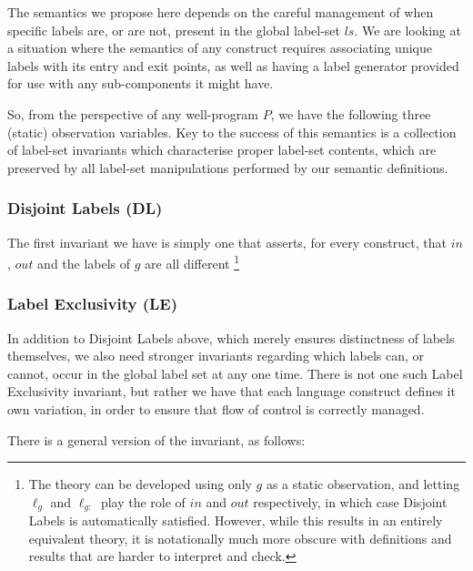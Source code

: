 The semantics we propose here depends on the careful management
of when specific labels are, or are not,
present in the global label-set $ls$.
We are looking at a situation where the semantics of any construct
requires associating unique labels with its entry and exit points,
as well as having a label generator provided for use with any sub-components
it might have.

So, from the perspective of any well-program $P$,
we have the following three (static) observation variables.
Key to the success of this semantics is a collection of label-set invariants
which characterise proper label-set contents,
which are preserved by all label-set manipulations performed
by our semantic definitions.

\subsubsection{Disjoint Labels (DL)}\label{sssec:disjoint-labels}

The first invariant we have is simply one that asserts,
for every construct, that $in$, $out$ and the labels of $g$
are all different
\footnote{The theory can be developed using only $g$ as a static observation,
and letting $\ell_g$ and $\ell_{g:}$ play the role of $in$ and $out$
respectively, in which case Disjoint Labels is automatically satisfied.
However, while this results in an entirely equivalent theory,
it is notationally much more obscure
with definitions and results that are harder to interpret and check.
}%



\subsubsection{Label Exclusivity (LE)}

In addition to Disjoint Labels above,
which merely ensures distinctness of labels themselves,
we also need stronger invariants regarding which labels can, or cannot,
occur in the global label set at any one time.
There is not one such Label Exclusivity invariant,
but rather we have that each language construct defines it own
variation, in order to ensure that flow of control is correctly managed.

There is a general version of the invariant, as follows:

